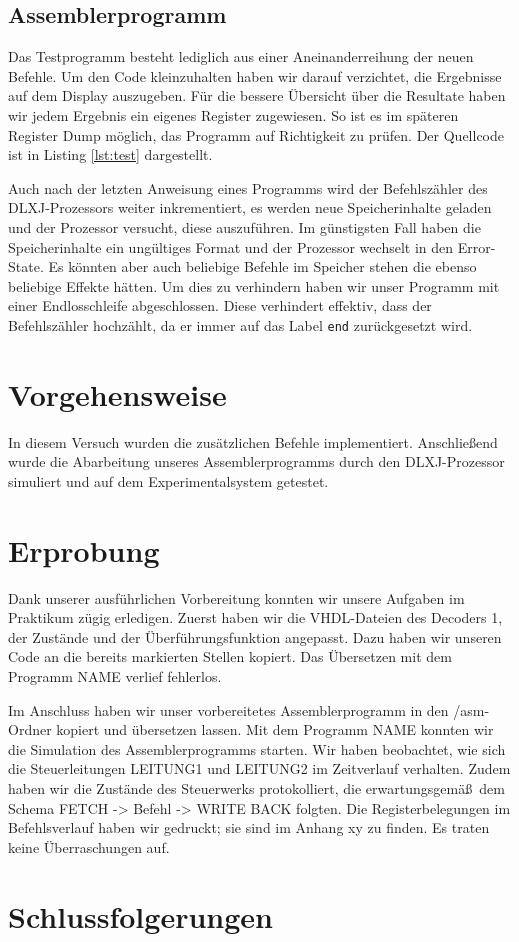 \documentclass[12pt,a4paper]{scrartcl}
\begin{document}
\subsection*{Assemblerprogramm}
Das Testprogramm besteht lediglich aus einer Aneinanderreihung der neuen Befehle.
Um den Code kleinzuhalten haben wir darauf verzichtet, die Ergebnisse auf dem Display auszugeben.
F\"ur die bessere \"Ubersicht \"uber die Resultate haben wir jedem Ergebnis ein eigenes Register zugewiesen.
So ist es im sp\"ateren Register Dump m\"oglich, das Programm auf Richtigkeit zu pr\"ufen.
Der Quellcode ist in Listing \ref{lst:test} dargestellt.


Auch nach der letzten Anweisung eines Programms wird der Befehlsz\"ahler des DLXJ-Prozessors weiter inkrementiert, es werden neue Speicherinhalte geladen und der Prozessor versucht, diese auszuf\"uhren.
Im g\"unstigsten Fall haben die Speicherinhalte ein ung\"ultiges Format und der Prozessor wechselt in den Error-State.
Es k\"onnten aber auch beliebige Befehle im Speicher stehen die ebenso beliebige Effekte h\"atten.
Um dies zu verhindern haben wir unser Programm mit einer Endlosschleife abgeschlossen.
Diese verhindert effektiv, dass der Befehlsz\"ahler hochz\"ahlt, da er immer auf das Label \texttt{end} zur\"uckgesetzt wird.

\section{Vorgehensweise}
In diesem Versuch wurden die zus\"atzlichen Befehle implementiert.
Anschlie\ss end wurde die Abarbeitung unseres Assemblerprogramms durch den DLXJ-Prozessor simuliert und auf dem Experimentalsystem getestet.

\section{Erprobung}
Dank unserer ausf\"uhrlichen Vorbereitung konnten wir unsere Aufgaben im Praktikum z\"ugig erledigen.
Zuerst haben wir die VHDL-Dateien des Decoders 1, der Zust\"ande und der \"Uberf\"uhrungsfunktion angepasst.
Dazu haben wir unseren Code an die bereits markierten Stellen kopiert.
Das \"Ubersetzen mit dem Programm NAME verlief fehlerlos.

Im Anschluss haben wir unser vorbereitetes Assemblerprogramm in den /asm-Ordner kopiert und \"ubersetzen lassen.
Mit dem Programm NAME konnten wir die Simulation des Assemblerprogramms starten.
Wir haben beobachtet, wie sich die Steuerleitungen LEITUNG1 und LEITUNG2 im Zeitverlauf verhalten.
Zudem haben wir die Zust\"ande des Steuerwerks protokolliert, die erwartungsgem\"a\ss\  dem Schema FETCH -> Befehl -> WRITE BACK folgten.
Die Registerbelegungen im Befehlsverlauf haben wir gedruckt; sie sind im Anhang xy zu finden.
Es traten keine \"Uberraschungen auf.


\section{Schlussfolgerungen}
\end{document}
